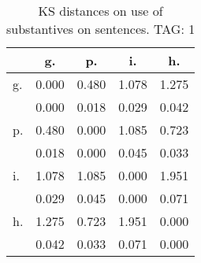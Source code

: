 \begin{table}[h!]
\begin{center}
\begin{tabular}{| l | c | c | c | c |}\hline
 & g. & p. & i. & h. \\\hline
g. & 0.000  & 0.480  & 1.078  & 1.275 \\\hline
 & 0.000  & 0.018  & 0.029  & 0.042 \\\hline
p. & 0.480  & 0.000  & 1.085  & 0.723 \\\hline
 & 0.018  & 0.000  & 0.045  & 0.033 \\\hline
i. & 1.078  & 1.085  & 0.000  & 1.951 \\\hline
 & 0.029  & 0.045  & 0.000  & 0.071 \\\hline
h. & 1.275  & 0.723  & 1.951  & 0.000 \\\hline
 & 0.042  & 0.033  & 0.071  & 0.000 \\\hline
\end{tabular}
\caption{KS distances on use of substantives on sentences. TAG: 1}
\end{center}
\end{table}